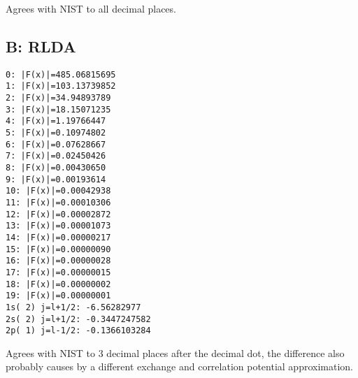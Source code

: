Agrees with NIST to all decimal places.

\subsection{B: RLDA}

\begin{lstlisting}
0: |F(x)|=485.06815695
1: |F(x)|=103.13739852
2: |F(x)|=34.94893789
3: |F(x)|=18.15071235
4: |F(x)|=1.19766447
5: |F(x)|=0.10974802
6: |F(x)|=0.07628667
7: |F(x)|=0.02450426
8: |F(x)|=0.00430650
9: |F(x)|=0.00193614
10: |F(x)|=0.00042938
11: |F(x)|=0.00010306
12: |F(x)|=0.00002872
13: |F(x)|=0.00001073
14: |F(x)|=0.00000217
15: |F(x)|=0.00000090
16: |F(x)|=0.00000028
17: |F(x)|=0.00000015
18: |F(x)|=0.00000002
19: |F(x)|=0.00000001
1s( 2) j=l+1/2: -6.56282977
2s( 2) j=l+1/2: -0.3447247582
2p( 1) j=l-1/2: -0.1366103284
\end{lstlisting}

Agrees with NIST to 3 decimal places after the decimal dot, the difference also
probably causes by a different exchange and correlation potential
approximation.

